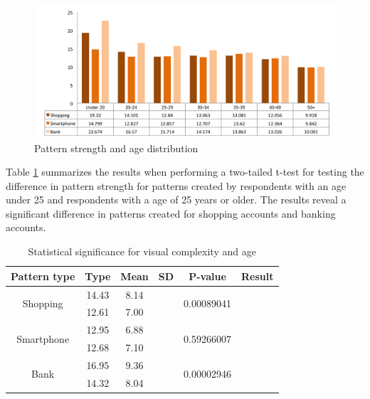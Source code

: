     \begin{figure}[H]
      \centering
      \includegraphics[width=\textwidth]{pics/analysis/strengthagedist.png}
      \caption{Pattern strength and age distribution}
      \label{fig:strengthagedist}
    \end{figure}

    Table \ref{tab:statsigComplexityAge} summarizes the results when performing a two-tailed t-test for testing the difference in pattern strength for patterns created by respondents with an age under 25 and respondents with a age of 25 years or older. The results reveal a significant difference in patterns created for shopping accounts and banking accounts. 

    \begin{table}[H]
      \centering
      \begin{tabular}{ c | c | c | c | c | c }
      \hline
        {\bf Pattern type} & {\bf Type} & {\bf Mean} & {\bf SD} & {\bf P-value} & {\bf Result} \\ \hline
        \multirow{2}{*}{Shopping}   & 14.43 & 8.14 & & \multirow{2}{*}{0.00089041} & \multirow{2}{*}{\bf \color{olive}{Significant}} \\
                                    & 12.61 & 7.00 & & & \\ \hline
        \multirow{2}{*}{Smartphone} & 12.95 & 6.88 & & \multirow{2}{*}{0.59266007} & \multirow{2}{*}{\bf \color{red}{Not significant}} \\
                                    & 12.68 & 7.10 & & & \\ \hline
        \multirow{2}{*}{Bank}       & 16.95 & 9.36 & & \multirow{2}{*}{0.00002946} & \multirow{2}{*}{\bf \color{olive}{Significant}} \\
                                    & 14.32 & 8.04 & & & \\ \hline
      \end{tabular}
      \caption{Statistical significance for visual complexity and age}
      \label{tab:statsigComplexityAge}
    \end{table}
         
